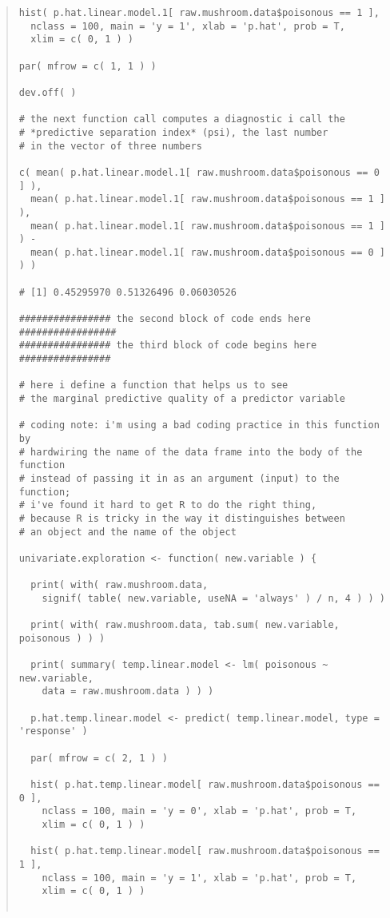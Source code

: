 \documentclass[12pt]{article}
\begin{document}
\begin{quote}
\begin{verbatim}
hist( p.hat.linear.model.1[ raw.mushroom.data$poisonous == 1 ],
  nclass = 100, main = 'y = 1', xlab = 'p.hat', prob = T,
  xlim = c( 0, 1 ) )

par( mfrow = c( 1, 1 ) )

dev.off( )

# the next function call computes a diagnostic i call the
# *predictive separation index* (psi), the last number
# in the vector of three numbers

c( mean( p.hat.linear.model.1[ raw.mushroom.data$poisonous == 0 ] ),
  mean( p.hat.linear.model.1[ raw.mushroom.data$poisonous == 1 ] ),
  mean( p.hat.linear.model.1[ raw.mushroom.data$poisonous == 1 ] ) -
  mean( p.hat.linear.model.1[ raw.mushroom.data$poisonous == 0 ] ) )

# [1] 0.45295970 0.51326496 0.06030526

################ the second block of code ends here #################
################ the third block of code begins here ################

# here i define a function that helps us to see
# the marginal predictive quality of a predictor variable

# coding note: i'm using a bad coding practice in this function by
# hardwiring the name of the data frame into the body of the function
# instead of passing it in as an argument (input) to the function;
# i've found it hard to get R to do the right thing,
# because R is tricky in the way it distinguishes between
# an object and the name of the object

univariate.exploration <- function( new.variable ) {

  print( with( raw.mushroom.data, 
    signif( table( new.variable, useNA = 'always' ) / n, 4 ) ) )

  print( with( raw.mushroom.data, tab.sum( new.variable, poisonous ) ) )

  print( summary( temp.linear.model <- lm( poisonous ~ new.variable, 
    data = raw.mushroom.data ) ) )

  p.hat.temp.linear.model <- predict( temp.linear.model, type = 'response' )

  par( mfrow = c( 2, 1 ) )

  hist( p.hat.temp.linear.model[ raw.mushroom.data$poisonous == 0 ],
    nclass = 100, main = 'y = 0', xlab = 'p.hat', prob = T,
    xlim = c( 0, 1 ) )

  hist( p.hat.temp.linear.model[ raw.mushroom.data$poisonous == 1 ],
    nclass = 100, main = 'y = 1', xlab = 'p.hat', prob = T,
    xlim = c( 0, 1 ) )


\end{verbatim}
\end{quote}
\end{document}
